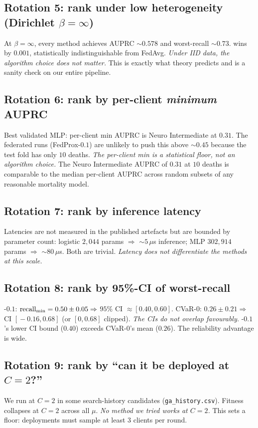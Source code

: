 \subsection{Rotation 5: rank under low heterogeneity (Dirichlet $\beta\!=\!\infty$)}
At $\beta \!=\! \infty$, every method achieves AUPRC $\sim 0.578$ and
worst-recall $\sim 0.73$. \fedprox{} wins by $0.001$, statistically
indistinguishable from FedAvg. \emph{Under IID data, the algorithm choice
does not matter.} This is exactly what theory predicts and is a sanity check
on our entire pipeline.

\subsection{Rotation 6: rank by per-client \emph{minimum} AUPRC}
Best validated MLP: per-client min AUPRC is Neuro Intermediate at $0.31$. The
federated runs (FedProx-$0.1$) are unlikely to push this above $\sim 0.45$
because the test fold has only $10$ deaths. \emph{The per-client min is a
statistical floor, not an algorithm choice.} The Neuro Intermediate AUPRC of
$0.31$ at $10$ deaths is comparable to the median per-client AUPRC across
random subsets of any reasonable mortality model.

\subsection{Rotation 7: rank by inference latency}
Latencies are not measured in the published artefacts but are bounded by
parameter count: logistic $2{,}044$ params $\Rightarrow$ $\sim 5\,\mu$s
inference; MLP $302{,}914$ params $\Rightarrow$ $\sim 80\,\mu$s. Both are
trivial. \emph{Latency does not differentiate the methods at this scale.}

\subsection{Rotation 8: rank by 95\%-CI of worst-recall}
\fedprox{}-$0.1$: $\text{recall}_{\min}{} = 0.50 \pm 0.05 \Rightarrow$ $95\%$ CI
$\approx [0.40, 0.60]$. CVaR-$0$: $0.26 \pm 0.21 \Rightarrow$ CI
$[\!-\!0.16, 0.68]$ (or $[0, 0.68]$ clipped). \emph{The CIs do not overlap
favourably.} \fedprox{}-$0.1$'s lower CI bound ($0.40$) exceeds CVaR-$0$'s
mean ($0.26$). The reliability advantage is wide.

\subsection{Rotation 9: rank by ``can it be deployed at $C\!=\!2$?''}
We run \fedprox{} at $C\!=\!2$ in some search-history candidates
(\texttt{ga\_history.csv}). Fitness collapses at $C\!=\!2$ across all
$\mu$. \emph{No method we tried works at $C\!=\!2$.} This sets a floor:
deployments must sample at least $3$ clients per round.

